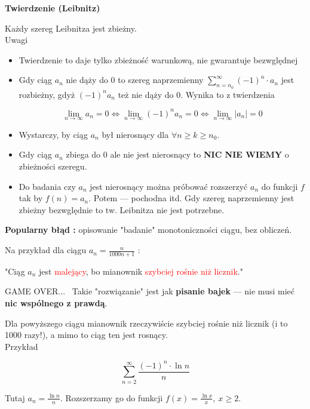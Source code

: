 \textbf{Twierdzenie (Leibnitz)}

Każdy szereg Leibnitza jest zbieżny. \\

Uwagi

\begin{itemize}
    \item Twierdzenie to daje tylko zbieżność warunkową, nie gwarantuje bezwględnej
    \item Gdy ciąg $a_n$ nie dąży do 0 to szereg naprzemienny $ \sum\limits_{n = n_0}^{\infty} (-1)^n \cdot a_n $ jest
    rozbieżny, gdyż $(-1)^n a_n$ też nie dąży do 0. Wynika to z twierdzenia

    $$ \lim_{n \to \infty} a_n = 0 \Leftrightarrow \lim_{n \to \infty} (-1)^n a_n = 0 \Leftrightarrow \lim_{n \to \infty} |a_n| = 0$$

    \item Wystarczy, by ciąg $a_n$ był nierosnący dla $ \forall n \geq k \geq n_0$.
    \item Gdy ciąg $a_n$ zbiega do 0 ale nie jest nierosnący to \textbf{NIC NIE WIEMY} o zbieżności szeregu.
    \item Do badania czy $a_n$ jest nierosnący można próbować rozszerzyć $a_n$ do funkcji $f$ tak by $f(n) = a_n$.
    Potem --- pochodna itd.
    Gdy szereg naprzemienny jest zbieżny bezwględnie to tw. Leibnitza nie jest potrzebne. \\
\end{itemize}

\textbf{Popularny błąd : } opisowanie "badanie" monotoniczności ciągu, bez obliczeń.

Na przykład dla ciągu $ a_n = \frac{n}{1000n + 1} $ :

"Ciąg $a_n$ jest \textcolor{red}{malejący}, bo mianownik \textcolor{red}{szybciej rośnie niż licznik}."

GAME OVER... \ Takie "rozwiązanie" jest jak \textbf{pisanie bajek} --- nie musi mieć \linebreak
\textbf{nic wspólnego z prawdą}.

Dla powyższego ciągu mianownik rzeczywiście szybciej rośnie niż licznik (i to 1000 razy!), a mimo to ciąg ten jest rosnący. \\

Przykład

$$ \sum\limits_{n=2}^{\infty} \frac{(-1)^n \cdot \ln n}{n} $$

Tutaj $ a_n = \frac{\ln n}{n} $. Rozszerzamy go do funkcji $ f(x) = \frac{\ln x}{x}, \ x \geq 2 $.

